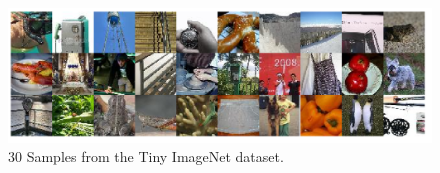 \begin{figure}[htbp]
  \centering
  \includegraphics[width=\linewidth]{../images/samples.png}
  \caption[]
  {\small
    30 Samples from the Tiny ImageNet dataset.
  }
  \label{fig:30_samples}
\end{figure}
